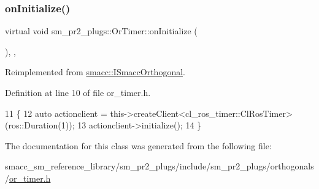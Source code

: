 \subsubsection{\texorpdfstring{on\+Initialize()}{onInitialize()}}
{\footnotesize\ttfamily virtual void sm\+\_\+pr2\+\_\+plugs\+::\+Or\+Timer\+::on\+Initialize (\begin{DoxyParamCaption}{ }\end{DoxyParamCaption})\hspace{0.3cm}{\ttfamily [inline]}, {\ttfamily [override]}, {\ttfamily [virtual]}}



Reimplemented from \hyperlink{classsmacc_1_1ISmaccOrthogonal_a6bb31c620cb64dd7b8417f8705c79c7a}{smacc\+::\+I\+Smacc\+Orthogonal}.



Definition at line 10 of file or\+\_\+timer.\+h.


\begin{DoxyCode}
11     \{
12         \textcolor{keyword}{auto} actionclient = this->createClient<cl\_ros\_timer::ClRosTimer>(ros::Duration(1));
13         actionclient->initialize();
14     \}
\end{DoxyCode}


The documentation for this class was generated from the following file\+:\begin{DoxyCompactItemize}
\item 
smacc\+\_\+sm\+\_\+reference\+\_\+library/sm\+\_\+pr2\+\_\+plugs/include/sm\+\_\+pr2\+\_\+plugs/orthogonals/\hyperlink{smacc__sm__reference__library_2sm__pr2__plugs_2include_2sm__pr2__plugs_2orthogonals_2or__timer_8h}{or\+\_\+timer.\+h}\end{DoxyCompactItemize}
